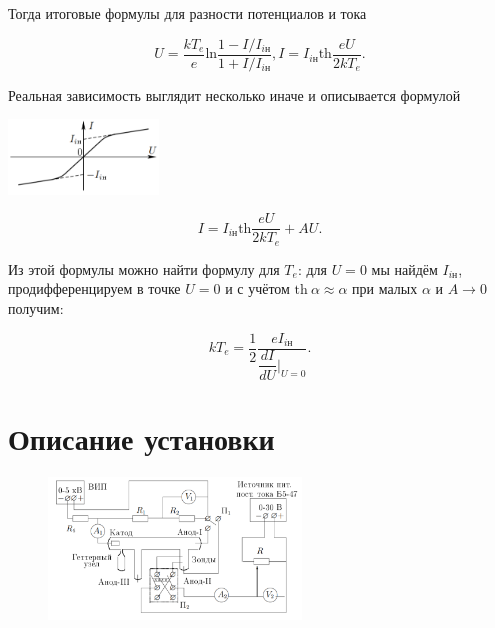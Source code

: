\documentclass[a4paper, 12pt]{article}
\begin{document}
            Тогда итоговые формулы для разности потенциалов и тока

            \begin{equation}
                U = \dfrac{kT_e}{e}\text{ln}\dfrac{1 - I/I_{i\text{н}}}{1 + I/I_{i\text{н}}},
                I = I_{i\text{н}} \text{th}\dfrac{eU}{2kT_e}.
            \end{equation}

            Реальная зависимость выглядит несколько иначе и описывается формулой

            \begin{floatingfigure}[r]{0.3\textwidth}
                \centering
                \includegraphics[width=0.3\textwidth]{img/4.png}
            \end{floatingfigure}

            \begin{equation}
                I = I_{i\text{н}} \text{th}\dfrac{eU}{2kT_e} + AU.
            \end{equation}

            Из этой формулы можно найти формулу для $T_e$: для $U=0$ мы найдём $I_{i\text{н}}$, продифференцируем в точке $U=0$ и с учётом $\text{th}~\alpha \approx \alpha$ при малых $\alpha$ и $A\rightarrow 0$ получим:

            \begin{equation}
                kT_e = \dfrac{1}{2}\dfrac{eI_{i\text{н}}}{\dfrac{dI}{dU}|_{U=0}}.
            \end{equation}

    \section{Описание установки}

        \begin{figure}[!ht]
            \centering
            \includegraphics[width=0.6\textwidth]{img/1.png}
        \end{figure}
\end{document}
